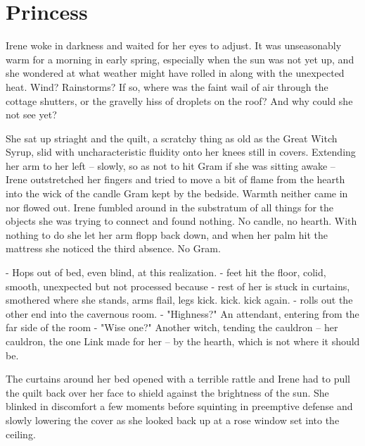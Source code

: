 \documentclass[../FGP.tex]{subfiles}
\begin{document}
\section{Princess}
\begin{fragment}
Irene woke in darkness and waited for her eyes to adjust. It was unseasonably warm for a morning in early spring, especially when the sun was not yet up, and she wondered at what weather might have rolled in along with the unexpected heat. Wind? Rainstorms? If so, where was the faint wail of air through the cottage shutters, or the gravelly hiss of droplets on the roof? And why could she not see yet?

She sat up striaght and the quilt, a scratchy thing as old as the Great Witch Syrup, slid with uncharacteristic fluidity onto her knees still in covers. Extending her arm to her left -- slowly, so as not to hit Gram if she was sitting awake -- Irene outstretched her fingers and tried to move a bit of flame from the hearth into the wick of the candle Gram kept by the bedside. Warmth neither came in nor flowed out. Irene fumbled around in the substratum of all things for the objects she was trying to connect and found nothing. No candle, no hearth. With nothing to do she let her arm flopp back down, and when her palm hit the mattress she noticed the third absence. No Gram.

- Hops out of bed, even blind, at this realization. 
   - feet hit the floor, colid, smooth, unexpected but not processed because
   - rest of her is stuck in curtains, smothered where she stands, arms flail, legs kick. kick. kick again. 
   - rolls out the other end into the cavernous room.
 - "Highness?" An attendant, entering from the far side of the room 
 - "Wise one?" Another witch, tending the cauldron -- her cauldron, the one Link made for her -- by the hearth, which is not where it should be.


The curtains around her bed opened with a terrible rattle and Irene had to pull the quilt back over her face to shield against the brightness of the sun. She blinked in discomfort a few moments before squinting in preemptive defense and slowly lowering the cover as she looked back up at a rose window set into the ceiling.


\end{fragment}
\end{document}
